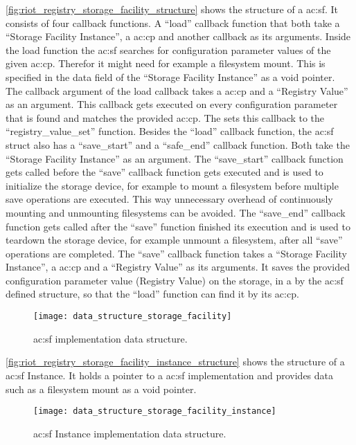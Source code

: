 {\autoref{fig:riot_registry_storage_facility_structure} shows the structure of a \gls{ac:sf}.
It consists of four callback functions.
A ``load'' callback function that both take a ``Storage Facility Instance'', a \gls{ac:cp} and another callback as its arguments.
Inside the load function the \gls{ac:sf} searches for configuration parameter values of the given \gls{ac:cp}.
Therefor it might need for example a filesystem mount.
This is specified in the data field of the ``Storage Facility Instance'' as a void pointer.
The callback argument of the load callback takes a \gls{ac:cp} and a ``Registry Value'' as an argument.
This callback gets executed on every configuration parameter that is found and matches the provided \gls{ac:cp}.
The  sets this callback to the ``registry\_value\_set'' function.
Besides the ``load'' callback function, the \gls{ac:sf} struct also has a ``save\_start'' and a ``safe\_end'' callback function.
Both take the ``Storage Facility Instance'' as an argument.
The ``save\_start'' callback function gets called before the ``save'' callback function gets executed and is used to initialize the storage device, for example to mount a filesystem before multiple save operations are executed.
This way unnecessary overhead of continuously mounting and unmounting filesystems can be avoided.
The ``save\_end'' callback function gets called after the ``save'' function finished its execution and is used to teardown the storage device, for example unmount a filesystem, after all ``save'' operations are completed.
The ``save'' callback function takes a ``Storage Facility Instance'', a \gls{ac:cp} and a ``Registry Value'' as its arguments.
It saves the provided configuration parameter value (Registry Value) on the storage, in a by the \gls{ac:sf} defined structure, so that the ``load'' function can find it by its \gls{ac:cp}.

\begin{figure}[H]
    \centering
    \texttt{[image: data\_structure\_storage\_facility]}
    \caption{ \gls{ac:sf} implementation data structure.}
    \label{fig:riot_registry_storage_facility_structure}
\end{figure}

\autoref{fig:riot_registry_storage_facility_instance_structure} shows the structure of a \gls{ac:sf} Instance.
It holds a pointer to a \gls{ac:sf} implementation and provides data such as a filesystem mount as a void pointer.

\begin{figure}[H]
    \centering
    \texttt{[image: data\_structure\_storage\_facility\_instance]}
    \caption{ \gls{ac:sf} Instance implementation data structure.}
    \label{fig:riot_registry_storage_facility_instance_structure}
\end{figure}

}

